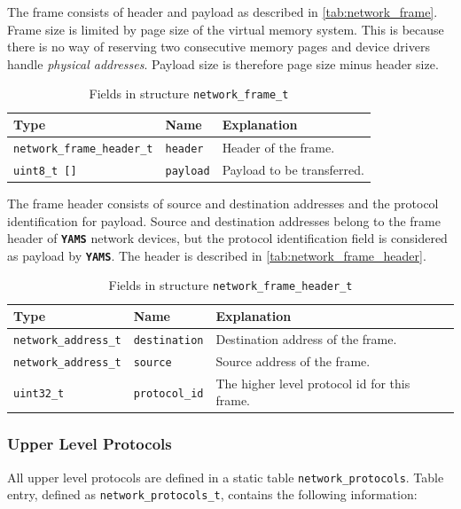 \documentclass[twoside,a4paper]{report}
\newcommand{\PBS}[1]{\let\temp=\\#1\let\\=\temp}
\newlength{\tablewidth}
\newenvironment{structdescription}{%
\begin{center}%
\begin{tabular}{p{3.5cm}|p{2.5cm}|>{\PBS\raggedright}p{\tablewidth-6\tabcolsep-6cm}}%
\textbf{Type} & \textbf{Name} & \textbf{Explanation} \\ %
}{%
\end{tabular}%
\end{center}%
}
\newcommand{\structfield}[3]{%
\hline%
\texttt{#1} & \texttt{#2} & #3 \\%
}
\newcommand{\yams}{\texttt{\textbf{YAMS}}}
\begin{document}
The frame consists of header and payload as described in
\autoref{tab:network_frame}. Frame size is limited by page size of the
virtual memory system. This is because there is no way of reserving
two consecutive memory pages and device drivers handle \emph{physical
addresses}. Payload size is therefore page size minus header size.


\begin{table}
\begin{structdescription}

\structfield{\small{network\_frame\_header\_t}}{header}{Header of the frame.}

\structfield{uint8\_t []}{payload}{Payload to be transferred.}

\end{structdescription}
\caption{Fields in structure \texttt{network\_frame\_t}}
\label{tab:network_frame}
\end{table}

The frame header consists of source and destination addresses and the
protocol identification for payload.  Source and destination addresses
belong to the frame header of \yams{} network devices, but the
protocol identification field is considered as payload by
\yams{}. The header is described in \autoref{tab:network_frame_header}.

\begin{table}
\begin{structdescription}

\structfield{network\_address\_t}{destination}{Destination address 
of the frame.}

\structfield{network\_address\_t}{source}{Source address of the frame.}

\structfield{uint32\_t}{protocol\_id}{The higher level protocol id for 
this frame.}

\end{structdescription}
\caption{Fields in structure \texttt{network\_frame\_header\_t}}
\label{tab:network_frame_header}
\end{table}


\subsubsection{Upper Level Protocols}

All upper level protocols are defined in a static table
\texttt{network\_protocols}.
Table entry, defined as
\texttt{network\_protocols\_t},
contains the following information:
\end{document}
